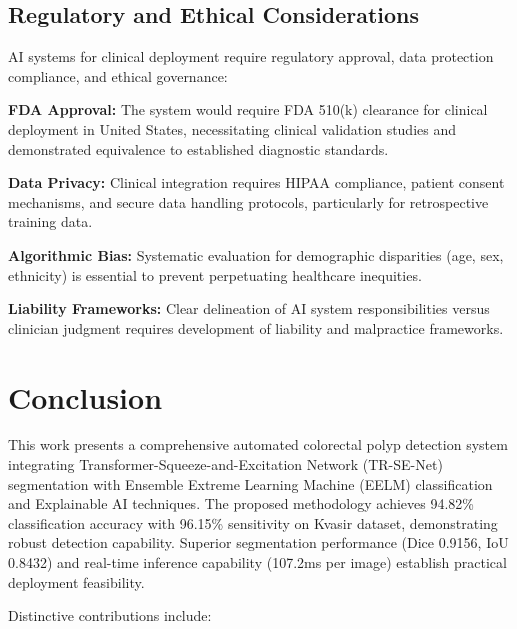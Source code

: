 \documentclass[11pt,a4paper]{article}
\begin{document}
\subsection{Regulatory and Ethical Considerations}

AI systems for clinical deployment require regulatory approval, data protection compliance, and ethical governance:

\textbf{FDA Approval:} The system would require FDA 510(k) clearance for clinical deployment in United States, necessitating clinical validation studies and demonstrated equivalence to established diagnostic standards.

\textbf{Data Privacy:} Clinical integration requires HIPAA compliance, patient consent mechanisms, and secure data handling protocols, particularly for retrospective training data.

\textbf{Algorithmic Bias:} Systematic evaluation for demographic disparities (age, sex, ethnicity) is essential to prevent perpetuating healthcare inequities.

\textbf{Liability Frameworks:} Clear delineation of AI system responsibilities versus clinician judgment requires development of liability and malpractice frameworks.

\section{Conclusion}
\label{sec:conclusion}

This work presents a comprehensive automated colorectal polyp detection system integrating Transformer-Squeeze-and-Excitation Network (TR-SE-Net) segmentation with Ensemble Extreme Learning Machine (EELM) classification and Explainable AI techniques. The proposed methodology achieves 94.82\% classification accuracy with 96.15\% sensitivity on Kvasir dataset, demonstrating robust detection capability. Superior segmentation performance (Dice 0.9156, IoU 0.8432) and real-time inference capability (107.2ms per image) establish practical deployment feasibility.

Distinctive contributions include:
\end{document}
